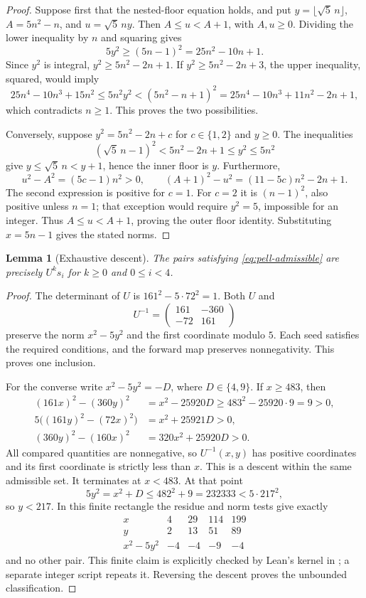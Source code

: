 \documentclass[11pt]{article}
\newtheorem{lemma}[theorem]{Lemma}
\begin{document}
\begin{proof}
Suppose first that the nested-floor equation holds, and put
$y=\lfloor\sqrt5\,n\rfloor$, $A=5n^2-n$, and $u=\sqrt5\,ny$.
Then $A\le u<A+1$, with $A,u\ge0$. Dividing the lower inequality by $n$
and squaring gives
\[
 5y^2\ge(5n-1)^2=25n^2-10n+1.
\]
Since $y^2$ is integral, $y^2\ge5n^2-2n+1$.
If $y^2\ge5n^2-2n+3$, the upper inequality, squared, would imply
\[
 25n^4-10n^3+15n^2\le5n^2y^2
 <(5n^2-n+1)^2
 =25n^4-10n^3+11n^2-2n+1,
\]
which contradicts $n\ge1$. This proves the two possibilities.

Conversely, suppose $y^2=5n^2-2n+c$ for $c\in\{1,2\}$ and $y\ge0$.
The inequalities
\[
 (\sqrt5\,n-1)^2<5n^2-2n+1\le y^2\le5n^2
\]
give $y\le\sqrt5\,n<y+1$, hence the inner floor is $y$.
Furthermore,
\[
 u^2-A^2=(5c-1)n^2>0,\qquad
 (A+1)^2-u^2=(11-5c)n^2-2n+1.
\]
The second expression is positive for $c=1$. For $c=2$ it is
$(n-1)^2$, also positive unless $n=1$; that exception would require
$y^2=5$, impossible for an integer. Thus $A\le u<A+1$, proving the
outer floor identity. Substituting $x=5n-1$ gives the stated norms.
\end{proof}

\begin{lemma}[Exhaustive descent]\label{lem:pell-descent}
The pairs satisfying \eqref{eq:pell-admissible} are precisely
$U^ks_i$ for $k\ge0$ and $0\le i<4$.
\end{lemma}

\begin{proof}
The determinant of $U$ is $161^2-5\cdot72^2=1$. Both $U$ and
\[
 U^{-1}=\begin{pmatrix}161&-360\\-72&161\end{pmatrix}
\]
preserve the norm $x^2-5y^2$ and the first coordinate modulo $5$.
Each seed satisfies the required conditions, and the forward map preserves
nonnegativity. This proves one inclusion.

For the converse write $x^2-5y^2=-D$, where $D\in\{4,9\}$.
If $x\ge483$, then
\begin{align*}
 (161x)^2-(360y)^2&=x^2-25920D
       \ge483^2-25920\cdot9=9>0,\\
 5\big((161y)^2-(72x)^2\big)&=x^2+25921D>0,\\
 (360y)^2-(160x)^2&=320x^2+25920D>0.
\end{align*}
All compared quantities are nonnegative, so
$U^{-1}(x,y)$ has positive coordinates and its first coordinate is
strictly less than $x$. This is a descent within the same admissible set.
It terminates at $x<483$. At that point
\[
 5y^2=x^2+D\le482^2+9=232333<5\cdot217^2,
\]
so $y<217$. In this finite rectangle the residue and norm tests give
exactly
\[
\begin{array}{c|rrrr}
 x&4&29&114&199\\
 y&2&13&51&89\\
 x^2-5y^2&-4&-4&-9&-4
\end{array}
\]
and no other pair. This finite claim is explicitly checked by Lean's
kernel in ; a separate integer script
repeats it. Reversing the descent proves the unbounded classification.
\end{proof}
\end{document}
